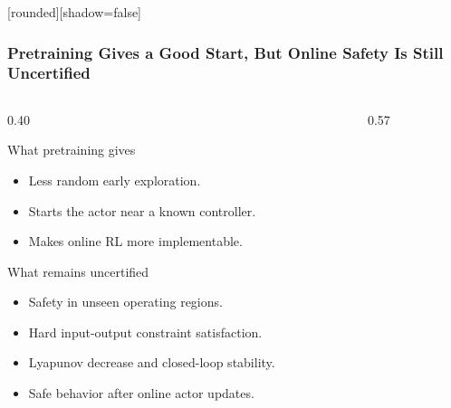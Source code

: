 \documentclass[aspectratio=169]{beamer}
\begin{document}
\begin{frame}
[rounded][shadow=false]
\frametitle{\large \textbf{Pretraining Gives a Good Start, But Online Safety Is Still Uncertified}}
\footnotesize

\vspace{-0.12cm}

\begin{columns}[T,onlytextwidth]

\begin{column}{0.40\textwidth}
\begin{block}{What pretraining gives}
\begin{itemize}\raggedright
  \setlength\itemsep{0.35ex}
  \item Less random early exploration.
  \item Starts the actor near a known controller.
  \item Makes online RL more implementable.
\end{itemize}
\end{block}

\vspace{0.04cm}

\begin{block}{What remains uncertified}
\begin{itemize}\raggedright
  \setlength\itemsep{0.35ex}
  \item Safety in unseen operating regions.
  \item Hard input-output constraint satisfaction.
  \item Lyapunov decrease and closed-loop stability.
  \item Safe behavior after online actor updates.
\end{itemize}
\end{block}

\end{column}

\begin{column}{0.57\textwidth}
\centering
\vspace{-0.08cm}


\end{column}
\end{columns}
\end{frame}
\end{document}
